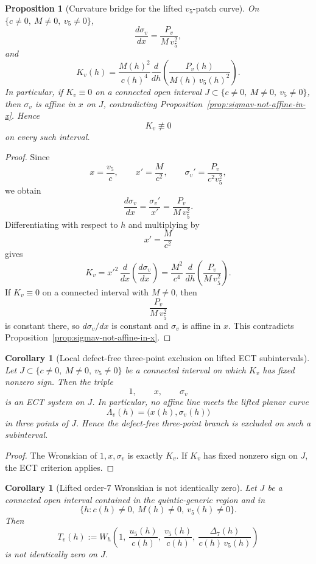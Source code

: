 \documentclass[11pt,a4paper]{amsart}
\theoremstyle{plain}
\newtheorem{proposition}[theorem]{Proposition}
\newtheorem{corollary}[theorem]{Corollary}
\theoremstyle{definition}
\begin{document}
\begin{proposition}[Curvature bridge for the lifted $v_5$-patch curve]
\label{prop:curvature-bridge-lifted-vpatch}
On $\{c\neq 0,\ M\neq 0,\ v_5\neq 0\}$,
\[
\frac{d\sigma_v}{dx}
=
\frac{P_v}{M\,v_5^2},
\]
and
\[
K_v(h)
=
\frac{M(h)^2}{c(h)^4}
\frac{d}{dh}\!\left(\frac{P_v(h)}{M(h)\,v_5(h)^2}\right).
\]
In particular, if $K_v\equiv 0$ on a connected open interval $J\subset
\{c\neq 0,\ M\neq 0,\ v_5\neq 0\}$, then $\sigma_v$ is affine in $x$ on
$J$, contradicting Proposition~\ref{prop:sigmav-not-affine-in-x}. Hence
\[
K_v\not\equiv 0
\]
on every such interval.
\end{proposition}

\begin{proof}
Since
\[
x=\frac{v_5}{c},
\qquad
x'=\frac{M}{c^2},
\qquad
\sigma_v'=\frac{P_v}{c^2v_5^2},
\]
we obtain
\[
\frac{d\sigma_v}{dx}
=
\frac{\sigma_v'}{x'}
=
\frac{P_v}{M\,v_5^2}.
\]
Differentiating with respect to $h$ and multiplying by
\[
x'=\frac{M}{c^2}
\]
gives
\[
K_v
=
x'^2\,\frac{d}{dx}\!\left(\frac{d\sigma_v}{dx}\right)
=
\frac{M^2}{c^4}\,
\frac{d}{dh}\!\left(\frac{P_v}{M\,v_5^2}\right).
\]
If $K_v\equiv 0$ on a connected interval with $M\neq 0$, then
\[
\frac{P_v}{M\,v_5^2}
\]
is constant there, so $d\sigma_v/dx$ is constant and $\sigma_v$ is affine
in $x$. This contradicts
Proposition~\ref{prop:sigmav-not-affine-in-x}.
\end{proof}

\begin{corollary}[Local defect-free three-point exclusion on lifted ECT subintervals]
\label{cor:local-three-point-exclusion-lifted-vpatch}
Let $J\subset\{c\neq 0,\ M\neq 0,\ v_5\neq 0\}$ be a connected interval on
which $K_v$ has fixed nonzero sign. Then the triple
\[
1,\qquad x,\qquad \sigma_v
\]
is an ECT system on $J$. In particular, no affine line meets the lifted
planar curve
\[
\Lambda_v(h)=\bigl(x(h),\sigma_v(h)\bigr)
\]
in three points of $J$. Hence the defect-free three-point branch is excluded
on such a subinterval.
\end{corollary}

\begin{proof}
The Wronskian of $1,x,\sigma_v$ is exactly $K_v$. If $K_v$ has fixed
nonzero sign on $J$, the ECT criterion applies.
\end{proof}

\begin{corollary}[Lifted order-$7$ Wronskian is not identically zero]
\label{cor:lifted-vpatch-wronskian-not-identically-zero}
Let $J$ be a connected open interval contained in the quintic-generic region
and in
\[
\{h:c(h)\neq 0,\ M(h)\neq 0,\ v_5(h)\neq 0\}.
\]
Then
\[
T_v(h):=
W_h\!\left(
1,\ \frac{u_5(h)}{c(h)},\ \frac{v_5(h)}{c(h)},\
\frac{\Delta_7(h)}{c(h)\,v_5(h)}
\right)
\]
is not identically zero on $J$.
\end{corollary}
\end{document}

